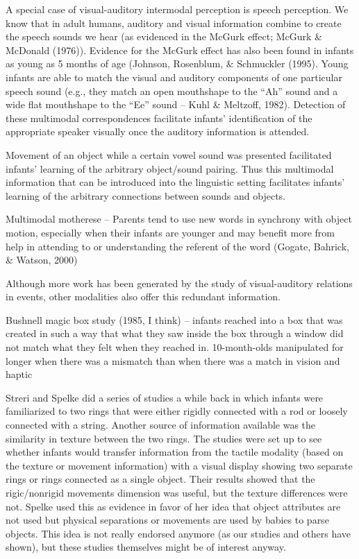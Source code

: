 	A special case of visual-auditory intermodal perception is speech perception.  We know that in adult humans, auditory and visual information combine to create the speech sounds we hear (as evidenced in the McGurk effect; McGurk \& McDonald (1976)).  Evidence for the McGurk effect has also been found in infants as young as 5 months of age (Johnson, Rosenblum, \& Schmuckler (1995).  Young infants are able to match the visual and auditory components of one particular speech sound (e.g., they match an open mouthshape to the ``Ah'' sound and a wide flat mouthshape to the ``Ee'' sound -- Kuhl \& Meltzoff, 1982).  Detection of these multimodal correspondences facilitate infants' identification of the appropriate speaker visually once the auditory information is attended.

Movement of an object while a certain vowel sound was presented facilitated infants' learning of the arbitrary object/sound pairing.  Thus this multimodal information that can be introduced into the linguistic setting facilitates infants' learning of the arbitrary connections between sounds and objects. 

Multimodal motherese -- Parents tend to use new words in synchrony with object motion, especially when their infants are younger and may benefit more from help in attending to or understanding the referent of the word (Gogate, Bahrick, \& Watson, 2000)



Although more work has been generated by the study of visual-auditory relations in events, other modalities also offer this redundant information.  

Bushnell magic box study (1985, I think) -- infants reached into a box that was created in such a way that what they saw inside the box through a window did not match what they felt when they reached in.  10-month-olds manipulated for longer when there was a mismatch than when there was a match in vision and haptic 



Streri and Spelke did a series of studies a while back in which infants were familiarized to two rings that were either rigidly connected with a rod or loosely connected with a string.  Another source of information available was the similarity in texture between the two rings.  The studies were set up to see whether infants would transfer information from the tactile modality (based on the texture or movement information) with a visual display showing two separate rings or rings connected as a single object.  Their results showed that the rigic/nonrigid movements dimension was useful, but the texture differences were not. Spelke used this as evidence in favor of her idea that object attributes are not used but physical separations or movements are used by babies to parse objects.  This idea is not really endorsed anymore (as our studies and others have shown), but these studies themselves might be of interest anyway.



